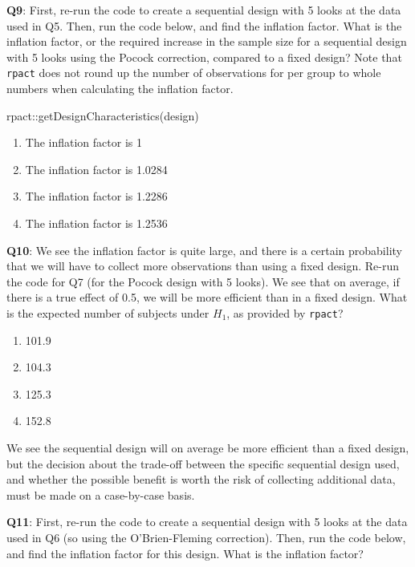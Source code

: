 \documentclass[
  oneside]{krantz}
\makeatletter
\newenvironment{Shaded}{\begin{snugshade}}{\end{snugshade}}
\newcommand{\FunctionTok}[1]{\textcolor[rgb]{0,0,0}{#1}}
\newcommand{\NormalTok}[1]{#1}
\newcommand{\SpecialCharTok}[1]{\textcolor[rgb]{0,0,0}{#1}}
\providecommand{\tightlist}{%
  \setlength{\itemsep}{0pt}\setlength{\parskip}{0pt}}
\newenvironment{kframe}{%
\medskip{}
\setlength{\fboxsep}{.8em}
 \def\at@end@of@kframe{}%
 \ifinner\ifhmode%
  \def\at@end@of@kframe{\end{minipage}}%
  \begin{minipage}{\columnwidth}%
 \fi\fi%
 \def\FrameCommand##1{\hskip\@totalleftmargin \hskip-\fboxsep
 \colorbox{shadecolor}{##1}\hskip-\fboxsep
     \hskip-\linewidth \hskip-\@totalleftmargin \hskip\columnwidth}%
 \MakeFramed {\advance\hsize-\width
   \@totalleftmargin\z@ \linewidth\hsize
   \@setminipage}}%
 {\par\unskip\endMakeFramed%
 \at@end@of@kframe}
\renewenvironment{Shaded}{\begin{kframe}}{\end{kframe}}
\makeatother
\begin{document}
\textbf{Q9}: First, re-run the code to create a sequential design with 5 looks at the data used in Q5. Then, run the code below, and find the inflation factor. What is the inflation factor, or the required increase in the sample size for a sequential design with 5 looks using the Pocock correction, compared to a fixed design? Note that \texttt{rpact} does not round up the number of observations for per group to whole numbers when calculating the inflation factor.

\begin{Shaded}
\begin{Highlighting}[]
\NormalTok{rpact}\SpecialCharTok{::}\FunctionTok{getDesignCharacteristics}\NormalTok{(design)}
\end{Highlighting}
\end{Shaded}

\begin{enumerate}
\def\labelenumi{\Alph{enumi})}
\tightlist
\item
  The inflation factor is 1
\item
  The inflation factor is 1.0284
\item
  The inflation factor is 1.2286
\item
  The inflation factor is 1.2536
\end{enumerate}

\textbf{Q10}: We see the inflation factor is quite large, and there is a certain probability that we will have to collect more observations than using a fixed design. Re-run the code for Q7 (for the Pocock design with 5 looks). We see that on average, if there is a true effect of 0.5, we will be more efficient than in a fixed design. What is the expected number of subjects under \(H_1\), as provided by \texttt{rpact}?

\begin{enumerate}
\def\labelenumi{\Alph{enumi})}
\tightlist
\item
  101.9
\item
  104.3
\item
  125.3
\item
  152.8
\end{enumerate}

We see the sequential design will on average be more efficient than a fixed design, but the decision about the trade-off between the specific sequential design used, and whether the possible benefit is worth the risk of collecting additional data, must be made on a case-by-case basis.

\textbf{Q11}: First, re-run the code to create a sequential design with 5 looks at the data used in Q6 (so using the O'Brien-Fleming correction). Then, run the code below, and find the inflation factor for this design. What is the inflation factor?
\end{document}
